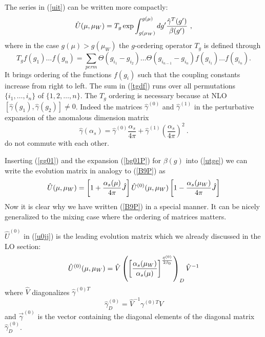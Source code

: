 \documentclass[12pt,rotate]{article}
\def\as{\alpha_s}
\newcommand{\eqn}{\ref}
\def\aspi{\frac{\as}{4\pi}}
\begin{document}
\begin{itemize}
\begin{itemize}
\begin{itemize}
The series in (\ref{uit}) can be written more compactly:
\begin{equation}\label{utge}
\hat U(\mu, \mu_W)=
T_g \exp\int^{g(\mu)}_{g(\mu_W)}dg'{\hat\gamma^T(g')\over\beta(g')}~,
\end{equation}
where in the case $g(\mu)>g(\mu_W)$ the $g$-ordering operator $T_g$ is
defined through
\begin{equation}\label{tgdf}
T_g f(g_1)\ldots f(g_n)=\sum_{perm}
\Theta(g_{i_1}-g_{i_2})\ldots
\Theta(g_{i_{n-1}}-g_{i_n})f(g_{i_1})\ldots f(g_{i_n}). \end{equation}
It brings ordering of the functions $f(g_i)$ such that the
coupling constants increase from right to left. The sum in (\eqn{tgdf}) runs
over all permutations $\{i_1,\ldots, i_n\}$ of $\{1, 2,\ldots, n\}$.
The $T_g$ ordering is necessary because at NLO
$[\hat\gamma(g_1), \hat\gamma(g_2)]\not= 0$. Indeed the matrices
$\hat\gamma^{(0)}$ and $\hat\gamma^{(1)}$ in the perturbative expansion
of the anomalous dimension matrix
\begin{equation}\label{gg01}
\hat\gamma(\as)=\hat\gamma^{(0)}\aspi + \hat\gamma^{(1)}\left(\aspi\right)^2~.
\end{equation}
do not commute with each other.

Inserting (\ref{gg01}) and the expansion (\ref{bg01P}) for $\beta(g)$
into (\ref{utge}) we can write the evolution matrix in analogy to
(\ref{B9P}) as
\begin{equation}\label{u0jj}
\hat U(\mu,\mu_W)=
\left[1+{\as(\mu)\over 4\pi} \hat J\right] \hat U^{(0)}(\mu,\mu_W) 
\left[1-{\as(\mu_W)\over 4\pi} \hat J\right]
\end{equation}
Now it is clear why we have written (\ref{B9P}) in a special manner.
It can be nicely generalized to the mixing case where the ordering
of matrices matters.

$\hat U^{(0)}$ in (\ref{u0jj}) is the leading evolution matrix which
we already discussed in the LO section:
\begin{equation}\label{u0vdP} 
\hat U^{(0)}(\mu,\mu_W)= \hat V
\left(
{\left[{\as(\mu_W)\over\as(\mu)}\right]}^{{\vec\gamma^{(0)}\over 2\beta_0}}
   \right)_D \hat V^{-1}   \end{equation}
where $\hat V$ diagonalizes ${\hat\gamma^{(0)T}}$
\begin{equation}\label{ga0dP} \hat\gamma^{(0)}_D=\hat V^{-1} {\gamma^{(0)T}} 
\hat V
\end{equation}
and $\vec\gamma^{(0)}$ is the vector containing the diagonal elements of
the diagonal matrix $\hat\gamma^{(0)}_D$.


\end{itemize}
\end{itemize}
\end{itemize}
\end{document}
